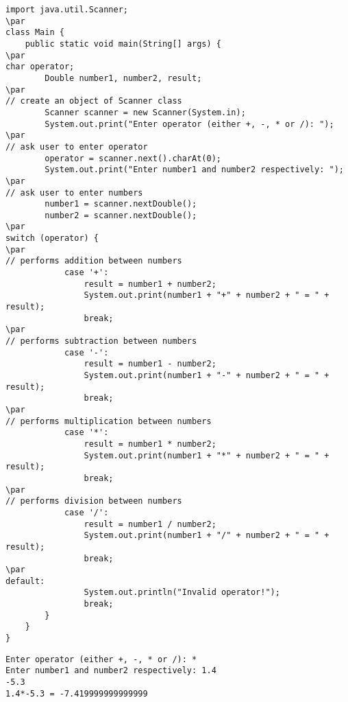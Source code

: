\documentclass{book}
\def\lthtmlcheckvsize{\ifdim\ht\sizebox<\vsize 
  \ifdim\wd\sizebox<\hsize\expandafter\hfill\fi \expandafter\vfill
  \else\expandafter\vss\fi}%
\begin{document}
{\newpage\clearpage
{}%
\begin{lstlisting}
import java.util.Scanner;
\par
class Main {
    public static void main(String[] args) {
\par
char operator;
        Double number1, number2, result;
\par
// create an object of Scanner class
        Scanner scanner = new Scanner(System.in);
        System.out.print("Enter operator (either +, -, * or /): ");
\par
// ask user to enter operator
        operator = scanner.next().charAt(0);
        System.out.print("Enter number1 and number2 respectively: ");
\par
// ask user to enter numbers
        number1 = scanner.nextDouble();
        number2 = scanner.nextDouble();
\par
switch (operator) {
\par
// performs addition between numbers
            case '+':
                result = number1 + number2;
                System.out.print(number1 + "+" + number2 + " = " + result);
                break;
\par
// performs subtraction between numbers
            case '-':
                result = number1 - number2;
                System.out.print(number1 + "-" + number2 + " = " + result);
                break;
\par
// performs multiplication between numbers
            case '*':
                result = number1 * number2;
                System.out.print(number1 + "*" + number2 + " = " + result);
                break;
\par
// performs division between numbers
            case '/':
                result = number1 / number2;
                System.out.print(number1 + "/" + number2 + " = " + result);
                break;
\par
default:
                System.out.println("Invalid operator!");
                break;
        }
    }
}
\end{lstlisting}%
\lthtmlfigureZ
\lthtmlcheckvsize\clearpage}

{\newpage\clearpage
{}%
\begin{lstlisting}
Enter operator (either +, -, * or /): *
Enter number1 and number2 respectively: 1.4
-5.3
1.4*-5.3 = -7.419999999999999
\end{lstlisting}%
\lthtmlfigureZ
\lthtmlcheckvsize\clearpage}
\end{document}
